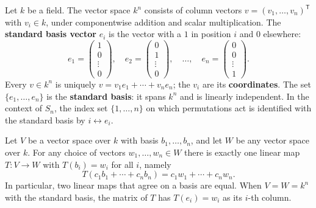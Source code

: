 \documentclass[11pt]{report}
\begin{document}
\begin{defbox}\label{def:standard-basis-kn}
Let $k$ be a field. The vector space $k^n$ consists of column vectors $v = (v_1, \ldots, v_n)^{\mathsf{T}}$ with $v_i \in k$, under componentwise addition and scalar multiplication. The \textbf{standard basis vector} $e_i$ is the vector with a $1$ in position $i$ and $0$ elsewhere:
\[ e_1 = \begin{pmatrix} 1 \\ 0 \\ \vdots \\ 0 \end{pmatrix}, \quad e_2 = \begin{pmatrix} 0 \\ 1 \\ \vdots \\ 0 \end{pmatrix}, \quad \ldots, \quad e_n = \begin{pmatrix} 0 \\ 0 \\ \vdots \\ 1 \end{pmatrix}. \]
Every $v \in k^n$ is uniquely $v = v_1 e_1 + \cdots + v_n e_n$; the $v_i$ are its \textbf{coordinates}. The set $\{e_1, \ldots, e_n\}$ is the \textbf{standard basis}: it spans $k^n$ and is linearly independent. In the context of $S_n$, the index set $\{1, \ldots, n\}$ on which permutations act is identified with the standard basis by $i \leftrightarrow e_i$.
\end{defbox}

\begin{thmbox}\label{thm:linear-extension}
Let $V$ be a vector space over $k$ with basis $b_1, \ldots, b_n$, and let $W$ be any vector space over $k$. For any choice of vectors $w_1, \ldots, w_n \in W$ there is exactly one linear map $T: V \to W$ with $T(b_i) = w_i$ for all $i$, namely
\[ T(c_1 b_1 + \cdots + c_n b_n) = c_1 w_1 + \cdots + c_n w_n. \]
In particular, two linear maps that agree on a basis are equal. When $V = W = k^n$ with the standard basis, the matrix of $T$ has $T(e_i) = w_i$ as its $i$-th column.
\end{thmbox}
\end{document}
